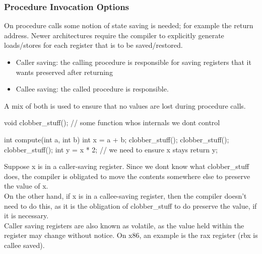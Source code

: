 \documentclass[11pt, a4paper]{article}
\theoremstyle{definition}
\theoremstyle{remark}
\begin{document}
\subsubsection{Procedure Invocation Options}
On procedure calls some notion of state saving is needed; for example the return address. Newer architectures require the compiler to explicitly generate loads/stores for each register that is to be saved/restored.
\begin{itemize}
    \item Caller saving: the calling procedure is responsible for saving registers that it wants preserved after returning
    \item Callee saving: the called procedure is responsible.
\end{itemize}
A mix of both is used to ensure that no values are lost during procedure calls.
\begin{ccode}
void clobber_stuff(); // some function whos internals we dont control

int compute(int a, int b) {
  int x = a + b;
  clobber_stuff();
  clobber_stuff();
  clobber_stuff();
  int y = x * 2; // we need to ensure x stays
  return y;
}
\end{ccode}
Suppose x is in a caller-saving register. Since we dont know what clobber\_stuff does, the compiler is obligated to move the contents somewhere else to preserve the value of x. \\
On the other hand, if x is in a callee-saving register, then the compiler doesn't need to do this, as it is the obligation of clobber\_stuff to do preserve the value, if it is necessary.\\
Caller saving registers are also known as volatile, as the value held within the register may change without notice. On x86, an example is the rax register (rbx is callee saved).
\end{document}
